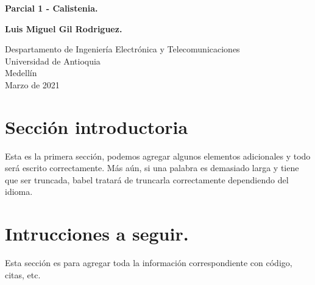 \documentclass{article}
\begin{document}
\begin{titlepage}
    \begin{center}
        \vspace*{1cm}
            
        \Huge
        \textbf{Parcial 1 - Calistenia.}
            
        \vspace{0.5cm}
        \LARGE
            
        \vspace{1.5cm}
            
        \textbf{Luis Miguel Gil Rodriguez.}
            
        \vfill
            
        \vspace{0.8cm}
            
        \Large
        Despartamento de Ingeniería Electrónica y Telecomunicaciones\\
        Universidad de Antioquia\\
        Medellín\\
        Marzo de 2021
            
    \end{center}
\end{titlepage}

\tableofcontents
\newpage
\section{Sección introductoria}\label{intro}
Esta es la primera sección, podemos agregar algunos elementos adicionales y todo será escrito correctamente. Más aún, si una palabra es demasiado larga y tiene que ser truncada, babel tratará de truncarla correctamente dependiendo del idioma.

\section{Intrucciones a seguir.} \label{contenido}
Esta sección es para agregar toda la información correspondiente con código, citas, etc.
\end{document}
